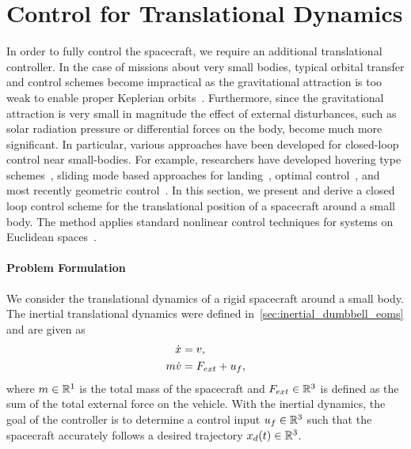 \section{Control for Translational Dynamics}

In order to fully control the spacecraft, we require an additional translational controller.
In the case of missions about very small bodies, typical orbital transfer and control schemes become impractical as the gravitational attraction is too weak to enable proper Keplerian orbits~\cite{broschart2005}.
Furthermore, since the gravitational attraction is very small in magnitude the effect of external disturbances, such as solar radiation pressure or differential forces on the body, become much more significant.
In particular, various approaches have been developed for closed-loop control near small-bodies.
For example, researchers have developed hovering type schemes~\cite{broschart2005,sawai2002}, sliding mode based approaches for landing~\cite{furfaro2013,liaw2000,zexu2012}, optimal control~\cite{guelman1994,guo2011,lantoine2006,miso1999}, and most recently geometric control~\cite{kulumani2017b,misra2015a}.
In this section, we present and derive a closed loop control scheme for the translational position of a spacecraft around a small body.
The method applies standard nonlinear control techniques for systems on Euclidean spaces~\cite{khalil1996}.

\paragraph{Problem Formulation}\label{sec:translation_control_problem_formulation}

We consider the translational dynamics of a rigid spacecraft around a small body.
The inertial translational dynamics were defined in~\cref{sec:inertial_dumbbell_eoms} and are given as
\begin{align*}
    \dot{x} &= v,\\
    m \dot{v} &= F_{ext} + u_f,
\end{align*}
where \( m \in \mathbb{R}^1 \) is the total mass of the spacecraft and \( F_{ext} \in \mathbb{R}^3 \) is defined as the sum of the total external force on the vehicle.
With the inertial dynamics, the goal of the controller is to determine a control input \( u_f \in \mathbb{R}^3 \) such that the spacecraft accurately follows a desired trajectory \( x_d(t) \in \mathbb{R}^3 \).


